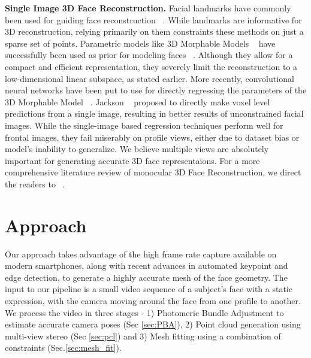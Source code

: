 \documentclass[10pt,twocolumn,letterpaper]{article}
\begin{document}
\noindent \textbf{Single Image 3D Face Reconstruction.} Facial landmarks have commonly been used for guiding face reconstruction ~\cite{zhu2015high, aldrian2010linear, kemelmacher20113d, dou2014robust}. While landmarks are informative for 3D reconstruction, relying primarily on them constraints these methods on just a sparse set of points. Parametric models like 3D Morphable Models ~\cite{blanz1999morphable} have successfully been used as prior for modeling faces ~\cite{blanz1999morphable, breuer2008automatic, zhu2015high, saito2017photorealistic, jiang20183d, richardson20163d, tuan2017regressing}. Although they allow for a compact and efficient representation, they severely limit the reconstruction to a low-dimensional linear subspace, as stated earlier. More recently, convolutional neural networks have been put to use for directly regressing the parameters of the 3D Morphable Model ~\cite{zhu2016face, jourabloo2016large, huber2016multiresolution}. Jackson \etal ~\cite{jackson2017large} proposed to directly make voxel level predictions from a single image, resulting in better results of unconstrained facial images. While the single-image based regression techniques perform well for frontal images, they fail miserably on profile views, either due to dataset bias or model's inability to generalize. We believe multiple views are absolutely important for generating accurate 3D face representaions.  For a more comprehensive literature review of monocular 3D Face Reconstruction, we direct the readers to ~\cite{zollhofer2018state}.




\section{Approach}

Our approach takes advantage of the high frame rate capture available on modern smartphones, along with recent advances in automated keypoint and edge detection, to generate a highly accurate mesh of the face geometry. 
The input to our pipeline is a small video sequence of a subject's face with a static expression, with the camera moving around the face from one profile to another.
We process the video in three stages -  1) Photomeric Bundle Adjustment to estimate accurate camera poses (Sec \ref{sec:PBA}), 2) Point cloud generation using multi-view stereo (Sec \ref{sec:pcl}) and 3) Mesh fitting using a combination of constraints (Sec.\ref{sec:mesh_fit}). 
\end{document}
